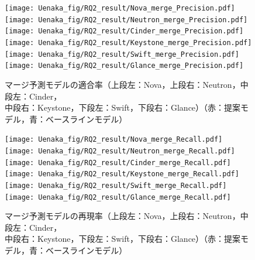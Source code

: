 \documentclass[submit]{ipsj}
\begin{document}
\clearpage
\begin{figure}[H]
\begin{minipage}{\textwidth}
\vspace{0.08\textheight}
\begin{center}
    \texttt{[image: Uenaka\_fig/RQ2\_result/Nova\_merge\_Precision.pdf]}
    \texttt{[image: Uenaka\_fig/RQ2\_result/Neutron\_merge\_Precision.pdf]}
    \texttt{[image: Uenaka\_fig/RQ2\_result/Cinder\_merge\_Precision.pdf]}
    \texttt{[image: Uenaka\_fig/RQ2\_result/Keystone\_merge\_Precision.pdf]}
    \texttt{[image: Uenaka\_fig/RQ2\_result/Swift\_merge\_Precision.pdf]}
    \texttt{[image: Uenaka\_fig/RQ2\_result/Glance\_merge\_Precision.pdf]}
    \caption{マージ予測モデルの適合率（上段左：Nova，上段右：Neutron，中段左：Cinder，\\ 中段右：Keystone，下段左：Swift，下段右：Glance）（赤：提案モデル，青：ベースラインモデル）}
    \label{fig:merge_p}
\end{center}
\vspace{0.08\textheight}
\end{minipage}
\end{figure}

\begin{figure}[H]
\begin{minipage}{\textwidth}
\vspace{0.08\textheight}
\begin{center}
    \texttt{[image: Uenaka\_fig/RQ2\_result/Nova\_merge\_Recall.pdf]}
    \texttt{[image: Uenaka\_fig/RQ2\_result/Neutron\_merge\_Recall.pdf]}
    \texttt{[image: Uenaka\_fig/RQ2\_result/Cinder\_merge\_Recall.pdf]}
    \texttt{[image: Uenaka\_fig/RQ2\_result/Keystone\_merge\_Recall.pdf]}
    \texttt{[image: Uenaka\_fig/RQ2\_result/Swift\_merge\_Recall.pdf]}
    \texttt{[image: Uenaka\_fig/RQ2\_result/Glance\_merge\_Recall.pdf]}
    \caption{マージ予測モデルの再現率（上段左：Nova，上段右：Neutron，中段左：Cinder，\\ 中段右：Keystone，下段左：Swift，下段右：Glance）（赤：提案モデル，青：ベースラインモデル）}
    \label{fig:merge_r}
\end{center}
\vspace{0.08\textheight}
\end{minipage}
\end{figure}
\end{document}
